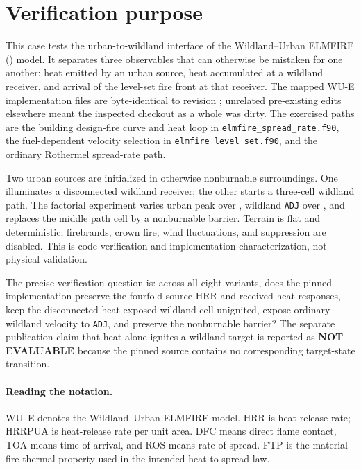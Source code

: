 \section{Verification purpose}
This case tests the urban-to-wildland interface of the Wildland--Urban ELMFIRE
(\WUE{}) model.  It separates three observables that can otherwise be
mistaken for one another: heat emitted by an urban source, heat accumulated at
a wildland receiver, and arrival of the level-set fire front at that receiver.
The mapped WU-E implementation files are byte-identical to revision
\SourceRevision{}; unrelated pre-existing edits elsewhere meant the inspected
checkout as a whole was dirty.  The
exercised paths are the building design-fire curve and heat loop in
\texttt{elmfire\_spread\_rate.f90}, the fuel-dependent velocity selection in
\texttt{elmfire\_level\_set.f90}, and the ordinary Rothermel spread-rate path.

Two urban sources are initialized in otherwise nonburnable surroundings.  One
illuminates a disconnected wildland receiver; the other starts a three-cell
wildland path.  The factorial experiment varies urban peak \HRRPUA{} over
\PeakSet{}, wildland \texttt{ADJ} over \AdjustmentSet{}, and replaces the
middle path cell by a nonburnable barrier.  Terrain is flat and deterministic;
firebrands, crown fire, wind fluctuations, and suppression are disabled.  This
is code verification and implementation characterization, not physical
validation.

The precise verification question is: across all eight variants, does the
pinned implementation preserve the fourfold source-HRR and received-heat
responses, keep the disconnected heat-exposed wildland cell unignited, expose
ordinary wildland velocity to \texttt{ADJ}, and preserve the nonburnable
barrier?  The separate publication claim that heat alone ignites a wildland
target is reported as \textbf{NOT EVALUABLE} because the pinned source contains
no corresponding target-state transition.


\paragraph{Reading the notation.}
WU--E denotes the Wildland--Urban ELMFIRE model. HRR is heat-release rate;
HRRPUA is heat-release rate per unit area. DFC means direct flame contact,
TOA means time of arrival, and ROS means rate of spread. FTP is the material
fire-thermal property used in the intended heat-to-spread law.

\ReportOverview

